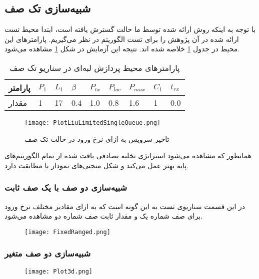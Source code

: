 \subsection{شبیه‌سازی تک صف}
با توجه به اینکه روش ارائه شده توسط ما حالت گسترش یافته \cite{Liu} است، ابتدا محیط تست ارائه شده در آن پژوهش را برای تست الگوریتم در نظر می‌گیریم. پارامترهای این محیط در جدول \ref{table:parameters-singlequeue} خلاصه شده اند. نتیجه این آزمایش در شکل \ref{plot:singleQueue} مشاهده می‌شود.

\begin{table}[H]
	\centering
	\begin{tabular}{@{}lllllllll@{}}
		\toprule
		\textbf{پارامتر} & $P_1$ & $L_1$ & $\beta$ & $P_{tx}$ & $P_{loc}$ & $P_{max}$ & $C_1$ & $t_{rx}$ \\ \midrule
		مقدار             & 1    & 17   & 0.4  & 1.0 & 0.8  & 1.6  & 1    & 0.0   \\ \bottomrule
	\end{tabular}
	\caption{پارامترهای محیط پردازش لبه‌ای در سناریو تک صف}
	\label{table:parameters-singlequeue}
\end{table}

\begin{figure}[H]
	\centering
	\texttt{[image: PlotLiuLimitedSingleQueue.png]}
	\caption{تاخیر سرویس به ازای نرخ ورود در حالت تک صف}
	\label{plot:singleQueue}
\end{figure}
همانطور که مشاهده می‌شود استراتژی تخلیه تصادفی یافت شده از تمام الگوریتم‌های پایه بهتر عمل می‌کند و شکل منحنی‌های نمودار با \cite{Liu} مطابقت دارد.
\newpage
\subsubsection{شبیه‌سازی دو صف با یک صف ثابت}
در این قسمت سناریوی تست به این گونه است که به ازای مقادیر مختلف نرخ ورود برای صف شماره یک و مقدار ثابت صف شماره دو مشاهده می‌شود.
\begin{figure}[H]
	\texttt{[image: FixedRanged.png]}
\end{figure}
\newpage
\subsubsection{شبیه‌سازی دو صف متغیر}
\begin{figure}[H]
	\texttt{[image: Plot3d.png]}
\end{figure}
\newpage
